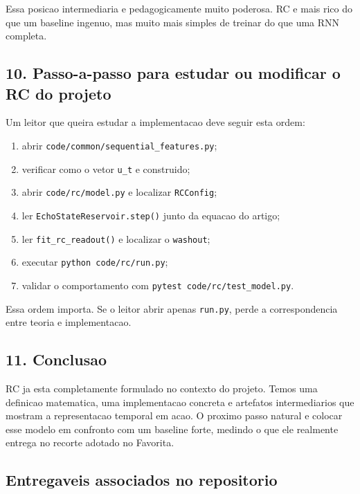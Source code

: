 \documentclass[12pt]{article}
\providecommand{\tightlist}{%
          \setlength{\itemsep}{0pt}\setlength{\parskip}{0pt}}
\begin{document}
Essa posicao intermediaria e pedagogicamente muito poderosa. RC e mais rico do que um baseline ingenuo, mas muito mais simples de treinar do que uma RNN completa.

\subsection{10. Passo-a-passo para estudar ou modificar o RC do projeto}\label{10-passo-a-passo-para-estudar-ou-modificar-o-rc-do-projeto}

Um leitor que queira estudar a implementacao deve seguir esta ordem:

\begin{enumerate}
\def\labelenumi{\arabic{enumi}.}
\tightlist
\item
  abrir \texttt{code/common/sequential\_features.py};
\item
  verificar como o vetor \texttt{u\_t} e construido;
\item
  abrir \texttt{code/rc/model.py} e localizar \texttt{RCConfig};
\item
  ler \texttt{EchoStateReservoir.step()} junto da equacao do artigo;
\item
  ler \texttt{fit\_rc\_readout()} e localizar o \texttt{washout};
\item
  executar \texttt{python\ code/rc/run.py};
\item
  validar o comportamento com \texttt{pytest\ code/rc/test\_model.py}.
\end{enumerate}

Essa ordem importa. Se o leitor abrir apenas \texttt{run.py}, perde a correspondencia entre teoria e implementacao.

\subsection{11. Conclusao}\label{11-conclusao}

RC ja esta completamente formulado no contexto do projeto. Temos uma definicao matematica, uma implementacao concreta e artefatos intermediarios que mostram a representacao temporal em acao. O proximo passo natural e colocar esse modelo em confronto com um baseline forte, medindo o que ele realmente entrega no recorte adotado no Favorita.

\subsection{Entregaveis associados no repositorio}\label{entregaveis-associados-no-repositorio}
\end{document}
